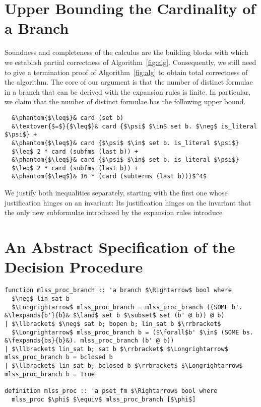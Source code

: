 \documentclass[sigplan,10pt,anonymous,review]{acmart}
\newcommand{\textover}[3][l]{%
 \makebox[\widthof{#3}][#1]{#2}%
}
\newcommand{\lefttrianglebar}{\mathrel{\tikz[baseline]{\draw (1ex, 0.75ex) -- (0, 1.25ex) -- (0, 0.25ex) -- cycle; \draw (0, 0.75ex) -- (1ex, 0.75ex);}}}
\newcommand{\lefttriangle}{\mathrel{\tikz[baseline]{\draw (1ex, 0.75ex) -- (0, 1.25ex) -- (0, 0.25ex) -- cycle;}}}
\newcommand{\lexpands}[2]{#1 $\lefttriangle$ #2}
\newcommand{\fexpands}[2]{#1 $\lefttrianglebar$ #2}
\begin{document}
\section{Upper Bounding the Cardinality of a Branch}
Soundness and completeness of the calculus are the building blocks with which we establish partial correctness of Algorithm~\ref{fig:alg}.
Consequently, we still need to give a termination proof of Algorithm~\ref{fig:alg} to obtain total correctness of the algorithm.
The core of our argument is that the number of distinct formulae in a branch that can be derived with the expansion rules is finite.
In particular, we claim that the number of distinct formulae has the following upper bound.
\begin{lstlisting}
  &\phantom{$\leq$}& card (set b)
  &\textover{$=$}{$\leq$}& card {$\psi$ $\in$ set b. $\neg$ is_literal $\psi$} +
  &\phantom{$\leq$}& card {$\psi$ $\in$ set b. is_literal $\psi$}
  $\leq$ 2 * card (subfms (last b)) +
  &\phantom{$\leq$}& card {$\psi$ $\in$ set b. is_literal $\psi$}
  $\leq$ 2 * card (subfms (last b)) +
  &\phantom{$\leq$}& 16 * (card (subterms (last b)))$^4$
\end{lstlisting}
We justify both inequalities separately, starting with the first one whose justification hinges on an invariant:
Its justification hinges on the invariant that the only new subformulae introduced by the expansion rules introduce


\section{An Abstract Specification of the Decision Procedure}
\begin{figure*}
  \centering
\begin{lstlisting}
function mlss_proc_branch :: 'a branch $\Rightarrow$ bool where
  $\neg$ lin_sat b
  $\Longrightarrow$ mlss_proc_branch = mlss_proc_branch ((SOME b'. &\lexpands{b'}{b}& $\land$ set b $\subset$ set (b' @ b)) @ b)
| $\llbracket$ $\neg$ sat b; bopen b; lin_sat b $\rrbracket$
  $\Longrightarrow$ mlss_proc_branch b = ($\forall$b' $\in$ (SOME bs. &\fexpands{bs}{b}&). mlss_proc_branch (b' @ b))
| $\llbracket$ lin_sat b; sat b $\rrbracket$ $\Longrightarrow$ mlss_proc_branch b = bclosed b
| $\llbracket$ lin_sat b; bclosed b $\rrbracket$ $\Longrightarrow$ mlss_proc_branch b = True

definition mlss_proc :: 'a pset_fm $\Rightarrow$ bool where
  mlss_proc $\phi$ $\equiv$ mlss_proc_branch [$\phi$]
\end{lstlisting}
\caption{Definition of the functions \lstinline|mlss_proc_branch| and \lstinline|mlss_proc|.\label{fig:alg}}
\end{figure*}
\end{document}
